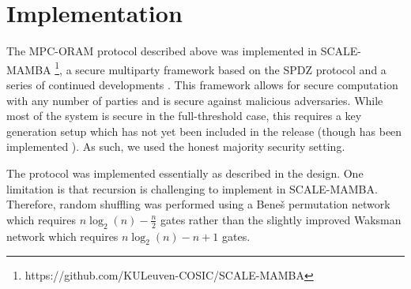 \section{Implementation}

The MPC-ORAM protocol described above was implemented in 
SCALE-MAMBA \footnote{https://github.com/KULeuven-COSIC/SCALE-MAMBA}, 
a secure multiparty framework based on the SPDZ protocol 
\cite{damgaard2012multiparty}
and a series of continued developments \cite{damgaard2013practical,
keller2018overdrive, aly2019zaphod}.
This framework allows for secure computation with any number of parties
and is secure against malicious adversaries.
While most of the system is secure in the full-threshold case,
this requires a key generation setup which has not yet been 
included in the release (though has been implemented \cite{rotaruactively}). 
As such, we used the honest majority security setting.

The protocol was implemented essentially as described in the design.
One limitation is that recursion is challenging to implement in
SCALE-MAMBA. Therefore, random shuffling was performed using
a Bene\v{s} permutation network \cite{benevs1964permutation}  
which requires $n \log_2(n) - \frac{n}{2}$ gates
rather than the slightly improved Waksman network
\cite{waksman1968permutation} 
which requires $n \log_2(n) - n + 1$ gates.


